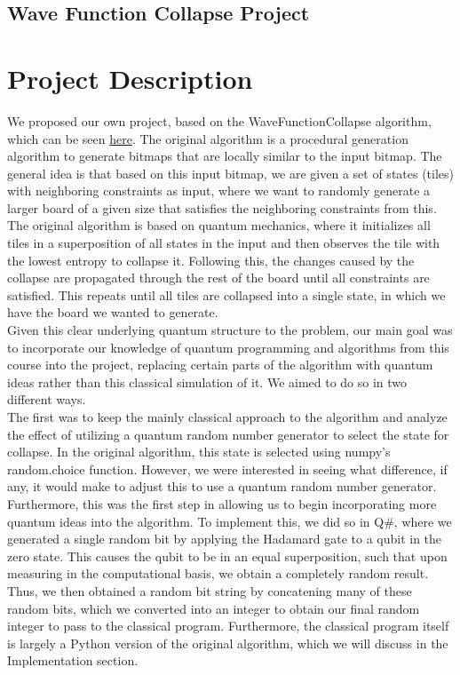 \documentclass[10pt]{article}
\begin{document}
\begin{center}
\section*{Wave Function Collapse Project}
\end{center}

\section{Project Description}
We proposed our own project, based on the WaveFunctionCollapse algorithm, which can be seen \href{https://github.com/mxgmn/WaveFunctionCollapse}{here}. The original algorithm is a procedural generation algorithm to generate bitmaps that are locally similar to the input bitmap. The general idea is that based on this input bitmap, we are given a set of states (tiles) with neighboring constraints as input, where we want to randomly generate a larger board of a given size that satisfies the neighboring constraints from this. The original algorithm is based on quantum mechanics, where it initializes all tiles in a superposition of all states in the input and then observes the tile with the lowest entropy to collapse it. Following this, the changes caused by the collapse are propagated through the rest of the board until all constraints are satisfied. This repeats until all tiles are collapsed into a single state, in which we have the board we wanted to generate.\\
\indent Given this clear underlying quantum structure to the problem, our main goal was to incorporate our knowledge of quantum programming and algorithms from this course into the project, replacing certain parts of the algorithm with quantum ideas rather than this classical simulation of it. We aimed to do so in two different ways.\\
\indent The first was to keep the mainly classical approach to the algorithm and analyze the effect of utilizing a quantum random number generator to select the state for collapse. In the original algorithm, this state is selected using numpy's random.choice function. However, we were interested in seeing what difference, if any, it would make to adjust this to use a quantum random number generator. Furthermore, this was the first step in allowing us to begin incorporating more quantum ideas into the algorithm. To implement this, we did so in Q$\#$, where we generated a single random bit by applying the Hadamard gate to a qubit in the zero state. This causes the qubit to be in an equal superposition, such that upon measuring in the computational basis, we obtain a completely random result. Thus, we then obtained a random bit string by concatening many of these random bits, which we converted into an integer to obtain our final random integer to pass to the classical program. Furthermore, the classical program itself is largely a Python version of the original algorithm, which we will discuss in the Implementation section.\\
\end{document}
